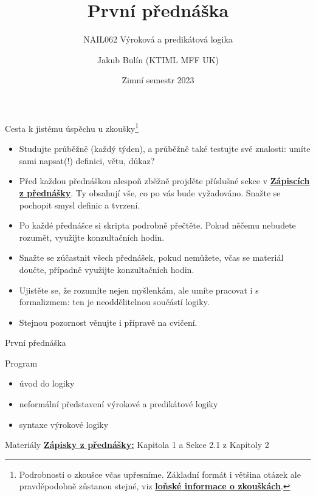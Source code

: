 \documentclass{beamer}
\title{První přednáška}
\subtitle{NAIL062 Výroková a predikátová logika}
\author{Jakub Bulín (KTIML MFF UK)}
\date{Zimní semestr 2023}
\begin{document}
\frame{\titlepage}


\begin{frame}{Cesta k jistému úspěchu u zkoušky\footnote{Podrobnosti o zkoušce včas upřesníme. Základní formát i většina otázek ale pravděpodobně zůstanou stejné, viz \href{https://jbulin.github.io/teaching/fall/nail062/files/info-o-zkouskach.pdf}{\alert{\textbf{loňské informace o zkouškách}}}.}}

\begin{itemize}    
    \item Studujte \alert{průběžně (každý týden)}, a průběžně také \alert{testujte své znalosti}: umíte sami \alert{napsat}(!) definici, větu, důkaz?
    \item Před každou přednáškou alespoň zběžně projděte příslušné sekce v \href{https://github.com/jbulin-mff-uk/nail062/raw/main/lecture/lecture-notes/lecture-notes.pdf}{\alert{\textbf{Zápiscích z přednášky}}}. Ty obsahují vše, co po vás bude vyžadováno. Snažte se pochopit smysl definic a tvrzení.
    \item Po každé přednášce si skripta \alert{podrobně přečtěte}. Pokud něčemu nebudete rozumět, využijte konzultačních hodin.
    \item Snažte se zúčastnit všech přednášek, pokud nemůžete, včas se materiál doučte, případně využijte konzultačních hodin.
    \item Ujistěte se, že rozumíte nejen myšlenkám, ale umíte pracovat i s \alert{formalizmem}: ten je neoddělitelnou součástí logiky.
    \item Stejnou pozornost věnujte i přípravě na \alert{cvičení}.
    \bigskip
\end{itemize}

\end{frame}


\begin{frame}{První přednáška}

    \begin{block}{Program}
        \begin{itemize}
            \item úvod do logiky
            \item neformální představení výrokové a predikátové logiky
            \item syntaxe výrokové logiky
        \end{itemize}        
    \end{block}

    \begin{block}{Materiály}
        \href{https://github.com/jbulin-mff-uk/nail062/raw/main/lecture/lecture-notes/lecture-notes.pdf}{\alert{\textbf{Zápisky z přednášky:}}} Kapitola 1 a Sekce 2.1 z Kapitoly 2
    \end{block}

\end{frame}
\end{document}
